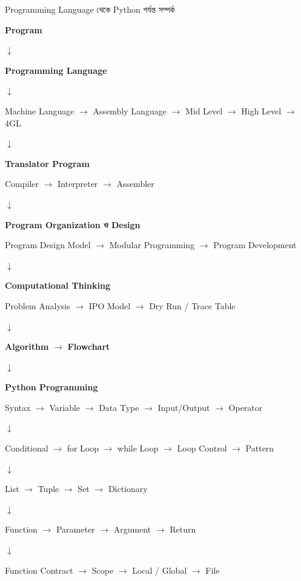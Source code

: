 \begin{revisionbox}{Programming Language থেকে Python পর্যন্ত সম্পর্ক}

\begin{center}

\textbf{Program}

\(\downarrow\)

\textbf{Programming Language}

\(\downarrow\)

Machine Language
\(\rightarrow\)
Assembly Language
\(\rightarrow\)
Mid Level
\(\rightarrow\)
High Level
\(\rightarrow\)
4GL

\medskip

\(\downarrow\)

\textbf{Translator Program}

Compiler
\(\rightarrow\)
Interpreter
\(\rightarrow\)
Assembler

\medskip

\(\downarrow\)

\textbf{Program Organization ও Design}

Program Design Model
\(\rightarrow\)
Modular Programming
\(\rightarrow\)
Program Development

\medskip

\(\downarrow\)

\textbf{Computational Thinking}

Problem Analysis
\(\rightarrow\)
IPO Model
\(\rightarrow\)
Dry Run / Trace Table

\medskip

\(\downarrow\)

\textbf{Algorithm}
\(\rightarrow\)
\textbf{Flowchart}

\medskip

\(\downarrow\)

\textbf{Python Programming}

Syntax
\(\rightarrow\)
Variable
\(\rightarrow\)
Data Type
\(\rightarrow\)
Input/Output
\(\rightarrow\)
Operator

\medskip

\(\downarrow\)

Conditional
\(\rightarrow\)
for Loop
\(\rightarrow\)
while Loop
\(\rightarrow\)
Loop Control
\(\rightarrow\)
Pattern

\medskip

\(\downarrow\)

List
\(\rightarrow\)
Tuple
\(\rightarrow\)
Set
\(\rightarrow\)
Dictionary

\medskip

\(\downarrow\)

Function
\(\rightarrow\)
Parameter
\(\rightarrow\)
Argument
\(\rightarrow\)
Return

\medskip

\(\downarrow\)

Function Contract
\(\rightarrow\)
Scope
\(\rightarrow\)
Local / Global
\(\rightarrow\)
File

\end{center}

\end{revisionbox}

